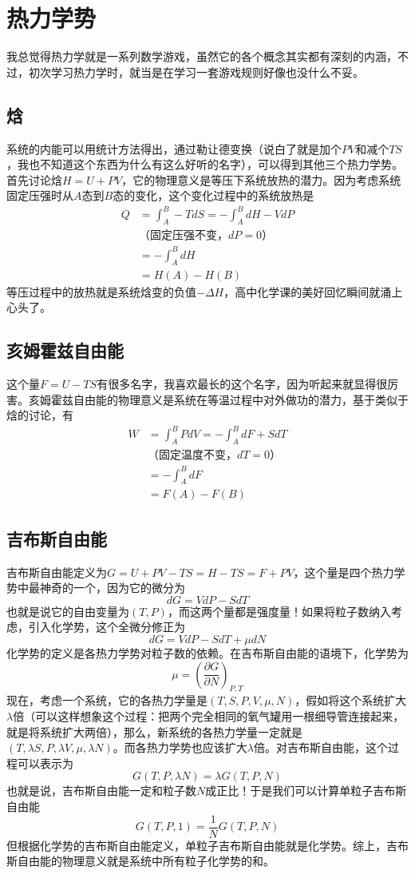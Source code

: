 \documentclass[a4paper,11pt]{ctexart}
\newcommand{\beq}{\begin{equation}}
\newcommand{\eeq}{\end{equation}}
\newcommand{\bea}{\begin{equation}\begin{aligned}}
\newcommand{\eea}{\end{aligned}\end{equation}}
\newcommand{\red}{\color{red}}
\def\pfrac#1#2#3{\left(\frac{\partial #1}{\partial #2}\right)_{#3}}
\begin{document}
\section{热力学势}
我总觉得热力学就是一系列数学游戏，虽然它的各个概念其实都有深刻的内涵，不过，初次学习热力学时，就当是在学习一套游戏规则好像也没什么不妥。
\subsection{焓}
系统的内能可以用统计方法得出，通过勒让德变换（说白了就是加个$PV$和减个$TS$，我也不知道这个东西为什么有这么好听的名字），可以得到其他三个热力学势。首先讨论焓$H = U + PV$，它的物理意义是等压下{\red 系统放热的潜力}。因为考虑系统固定压强时从$A$态到$B$态的变化，这个变化过程中的系统放热是
\bea
Q &= \int_A^B -TdS = -\int_A^B dH - VdP \\
&\text{（固定压强不变，$dP = 0$）} \\
&= -\int_A^B dH \\
&= H(A) - H(B)
\eea
等压过程中的放热就是系统焓变的负值$-\Delta H$，高中化学课的美好回忆瞬间就涌上心头了。
\subsection{亥姆霍兹自由能}
这个量$F = U - TS$有很多名字，我喜欢最长的这个名字，因为听起来就显得很厉害。亥姆霍兹自由能的物理意义是系统在等温过程中{\red 对外做功的潜力}，基于类似于焓的讨论，有
\bea
W &= \int_A^B PdV = -\int_A^B dF + SdT \\
&\text{（固定温度不变，$dT = 0$）} \\
&= -\int_A^B dF \\
&= F(A) - F(B)
\eea
\subsection{吉布斯自由能}
吉布斯自由能定义为$G = U + PV - TS = H - TS = F + PV$，这个量是四个热力学势中最神奇的一个，因为它的微分为
\beq
dG = VdP - SdT
\eeq
也就是说它的自由变量为$(T,P)$，而这两个量都是强度量！如果将粒子数纳入考虑，引入化学势，这个全微分修正为
\beq
dG = VdP - SdT + \mu dN
\eeq
化学势的定义是各热力学势对粒子数的依赖。在吉布斯自由能的语境下，化学势为
\beq
\mu = \pfrac{G}{N}{P,T}
\eeq
现在，考虑一个系统，它的各热力学量是$(T,S,P,V,\mu,N)$，假如将这个系统扩大$\lambda$倍（可以这样想象这个过程：把两个完全相同的氧气罐用一根细导管连接起来，就是将系统扩大两倍），那么，新系统的各热力学量一定就是$(T,\lambda S,P,\lambda V,\mu,\lambda N)$。而各热力学势也应该扩大$\lambda$倍。对吉布斯自由能，这个过程可以表示为
\beq
G(T,P,\lambda N) = \lambda G(T,P,N)
\eeq
也就是说，{\red 吉布斯自由能一定和粒子数$N$成正比}！于是我们可以计算单粒子吉布斯自由能
\beq
G(T,P,1) = \frac{1}{N} G(T,P,N)
\eeq
但根据化学势的吉布斯自由能定义，{\red 单粒子吉布斯自由能就是化学势}。综上，吉布斯自由能的物理意义就是系统中所有粒子化学势的和。
\end{document}
